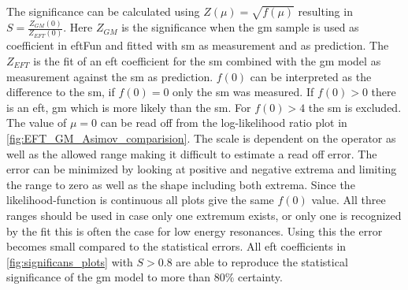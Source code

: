 \documentclass[../Bachelorarbeit.tex]{subfiles}
\begin{document}
The significance \cite{Cowan.2011} can be calculated using $Z(\mu)=\sqrt{f(\mu)}$ resulting in $S = \frac{Z_{GM}(0)}{Z_{EFT}(0)}$.
Here $Z_{GM}$ is the significance when the \acrshort{gm} sample is used as coefficient in \acrshort{eft}Fun \cite{EFTfun.} and fitted with \acrshort{sm} as measurement and as prediction.
The $Z_{EFT}$ is the fit of an \acrshort{eft} coefficient for the \acrshort{sm} combined with the \acrshort{gm} model as measurement against the \acrshort{sm} as prediction.
$f(0)$ can be interpreted as the difference to the \acrshort{sm}, if $f(0) = 0$ only the \acrshort{sm} was measured. If $f(0)>0$ there is an \acrshort{eft}, \acrshort{gm} which is more likely than the \acrshort{sm}. For $f(0) > 4$ the \acrshort{sm} is excluded.
The value of $\mu=0$ can be read off from the log-likelihood ratio plot in \ref{fig:EFT_GM_Asimov_comparision}. The scale is dependent on
the operator as well as the allowed range making it difficult to estimate a read off error. The error can be minimized by looking at positive and negative extrema and limiting the range to zero as well as the shape including both extrema.
Since the likelihood-function is continuous all plots give the same $f(0)$ value. All three ranges should be used in case only one extremum exists, or only one is recognized by the fit this is often the case for low energy resonances.
Using this the error becomes small compared to the statistical errors. All \acrshort{eft} coefficients in \ref{fig:significans_plots} with $S>0.8$ are able to reproduce the statistical significance of the \acrshort{gm} model to more than $80\%$ certainty.
\end{document}
